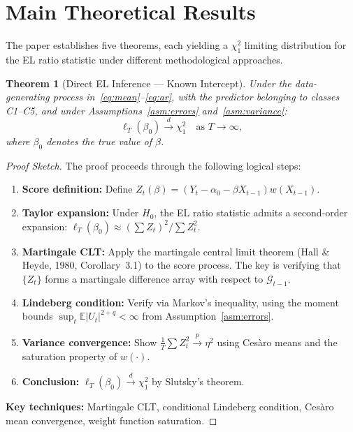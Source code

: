 \documentclass[11pt,a4paper]{article}
\newtheorem{theorem}{Theorem}[section]
\theoremstyle{definition}
\theoremstyle{remark}
\begin{document}
\section{Main Theoretical Results}

The paper establishes five theorems, each yielding a $\chi^2_1$ limiting distribution
for the EL ratio statistic under different methodological approaches.

\bigskip

\begin{theorem}[Direct EL Inference --- Known Intercept]\label{thm:1}
Under the data-generating process in~\eqref{eq:mean}--\eqref{eq:ar},
with the predictor belonging to classes C1--C5,
and under Assumptions~\ref{asm:errors} and~\ref{asm:variance}:
\begin{equation}
    \ell_T(\beta_0) \xrightarrow{d} \chi^2_1 \quad \text{as } T \to \infty,
\end{equation}
where $\beta_0$ denotes the true value of $\beta$.
\end{theorem}

\begin{proof}[Proof Sketch]
The proof proceeds through the following logical steps:
\begin{enumerate}[leftmargin=*, label=\textbf{\arabic*}.]
    \item \textbf{Score definition:}
    Define $Z_t(\beta) = (Y_t - \alpha_0 - \beta X_{t-1}) w(X_{t-1})$.
    \item \textbf{Taylor expansion:}
    Under $H_0$, the EL ratio statistic admits a second-order expansion:
    $\ell_T(\beta_0) \approx (\sum Z_t)^2 / \sum Z_t^2$.
    \item \textbf{Martingale CLT:}
    Apply the martingale central limit theorem (Hall \& Heyde, 1980, Corollary~3.1)
    to the score process. The key is verifying that $\{Z_t\}$ forms a
    martingale difference array with respect to $\mathcal{G}_{t-1}$.
    \item \textbf{Lindeberg condition:}
    Verify via Markov's inequality, using the moment bounds
    $\sup_t \mathbb{E}|U_t|^{2+q} < \infty$ from Assumption~\ref{asm:errors}.
    \item \textbf{Variance convergence:}
    Show $\frac{1}{T}\sum Z_t^2 \xrightarrow{p} \eta^2$ using
    Ces\`aro means and the saturation property of $w(\cdot)$.
    \item \textbf{Conclusion:}
    $\ell_T(\beta_0) \xrightarrow{d} \chi^2_1$ by Slutsky's theorem.
\end{enumerate}
\textbf{Key techniques:} Martingale CLT, conditional Lindeberg condition,
Ces\`aro mean convergence, weight function saturation.
\end{proof}
\end{document}
